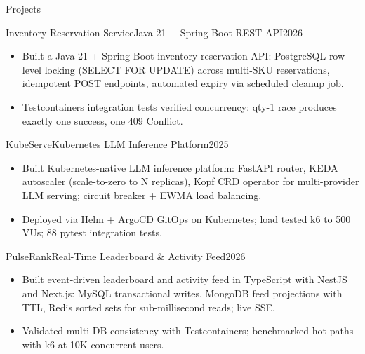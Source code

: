 \documentclass[]{mcdowellcv}
\begin{document}
\begin{cvsection}{Projects}
  \begin{cvsubsection}{Inventory Reservation Service}{Java 21 + Spring Boot REST API}{2026}
    \begin{itemize}
      \item Built a Java 21 + Spring Boot inventory reservation API: PostgreSQL row-level locking (SELECT FOR UPDATE) across multi-SKU reservations, idempotent POST endpoints, automated expiry via scheduled cleanup job.
      \item Testcontainers integration tests verified concurrency: qty-1 race produces exactly one success, one 409 Conflict.
    \end{itemize}
    \vspace{-1.5pt}
  \end{cvsubsection}

  \begin{cvsubsection}{KubeServe}{Kubernetes LLM Inference Platform}{2025}
    \begin{itemize}
      \item Built Kubernetes-native LLM inference platform: FastAPI router, KEDA autoscaler (scale-to-zero to N replicas), Kopf CRD operator for multi-provider LLM serving; circuit breaker + EWMA load balancing.
      \item Deployed via Helm + ArgoCD GitOps on Kubernetes; load tested k6 to 500 VUs; 88 pytest integration tests.
    \end{itemize}
    \vspace{-1.5pt}
  \end{cvsubsection}

  \begin{cvsubsection}{PulseRank}{Real-Time Leaderboard \& Activity Feed}{2026}
    \begin{itemize}
      \item Built event-driven leaderboard and activity feed in TypeScript with NestJS and Next.js: MySQL transactional writes, MongoDB feed projections with TTL, Redis sorted sets for sub-millisecond reads; live SSE.
      \item Validated multi-DB consistency with Testcontainers; benchmarked hot paths with k6 at 10K concurrent users.
    \end{itemize}
    \vspace{-1.5pt}
  \end{cvsubsection}
\end{cvsection}
\end{document}
